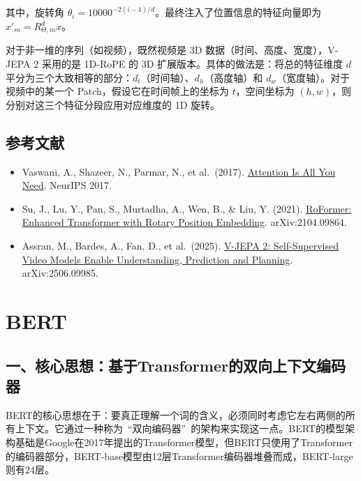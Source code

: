 其中，旋转角 \(\theta_i=10000^{-2(i-1)/d}\)。最终注入了位置信息的特征向量即为 \(x'_m=R_{\Theta,m}^{d}x\)。

对于非一维的序列（如视频），既然视频是 3D 数据（时间、高度、宽度），V-JEPA 2 采用的是 1D-RoPE 的 3D 扩展版本。具体的做法是：将总的特征维度 \(d\) 平分为三个大致相等的部分：\(d_t\)（时间轴）、\(d_h\)（高度轴）和 \(d_w\)（宽度轴）。对于视频中的某一个 Patch，假设它在时间帧上的坐标为 \(t\)，空间坐标为 \((h,w)\)，则分别对这三个特征分段应用对应维度的 1D 旋转。

\hypertarget{ux53c2ux8003ux6587ux732e-70}{%
\subsection{参考文献}\label{ux53c2ux8003ux6587ux732e-70}}

\vspace{0.25em}
\begin{itemize}
\tightlist
\item
  Vaswani, A., Shazeer, N., Parmar, N., et al.~(2017). \href{https://arxiv.org/abs/1706.03762}{Attention Is All You Need}. NeurIPS 2017.
\item
  Su, J., Lu, Y., Pan, S., Murtadha, A., Wen, B., \& Liu, Y. (2021). \href{https://arxiv.org/abs/2104.09864}{RoFormer: Enhanced Transformer with Rotary Position Embedding}. arXiv:2104.09864.
\item
  Assran, M., Bardes, A., Fan, D., et al.~(2025). \href{https://arxiv.org/abs/2506.09985}{V-JEPA 2: Self-Supervised Video Models Enable Understanding, Prediction and Planning}. arXiv:2506.09985.
\end{itemize}

\clearpage

\hypertarget{bert}{%
\section{BERT}\label{bert}}

\hypertarget{ux4e00ux6838ux5fc3ux601dux60f3ux57faux4e8etransformerux7684ux53ccux5411ux4e0aux4e0bux6587ux7f16ux7801ux5668}{%
\subsection{一、核心思想：基于Transformer的双向上下文编码器}\label{ux4e00ux6838ux5fc3ux601dux60f3ux57faux4e8etransformerux7684ux53ccux5411ux4e0aux4e0bux6587ux7f16ux7801ux5668}}

BERT的核心思想在于：要真正理解一个词的含义，必须同时考虑它左右两侧的所有上下文。它通过一种称为~``双向编码器''~的架构来实现这一点。BERT的模型架构基础是Google在2017年提出的Transformer模型，但BERT只使用了Transformer的编码器部分，BERT-base模型由12层Transformer编码器堆叠而成，BERT-large则有24层。

